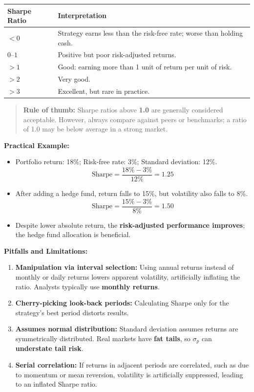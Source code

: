 \documentclass[12pt,openany]{book}
\begin{document}
\begin{center}
\begin{tabular}{|L{0.25\textwidth}|L{0.65\textwidth}|}
\hline
\textbf{Sharpe Ratio} & \textbf{Interpretation} \\
\hline
$< 0$ & Strategy earns less than the risk-free rate; worse than holding cash. \\
\hline
$0$--$1$ & Positive but poor risk-adjusted returns. \\
\hline
$> 1$ & Good: earning more than 1 unit of return per unit of risk. \\
\hline
$> 2$ & Very good. \\
\hline
$> 3$ & Excellent, but rare in practice. \\
\hline
\end{tabular}
\end{center}

\begin{quote}
    \textbf{Rule of thumb:} Sharpe ratios above \textbf{1.0} are generally considered acceptable. However, always compare against peers or benchmarks; a ratio of 1.0 may be below average in a strong market.
\end{quote}

\textbf{Practical Example:}
\begin{itemize}[leftmargin=*]
    \item Portfolio return: 18\%; Risk-free rate: 3\%; Standard deviation: 12\%.
    \begin{equation*}
        \text{Sharpe} = \frac{18\% - 3\%}{12\%} = 1.25
    \end{equation*}
    \item After adding a hedge fund, return falls to 15\%, but volatility also falls to 8\%.
    \begin{equation*}
        \text{Sharpe} = \frac{15\% - 3\%}{8\%} = 1.50
    \end{equation*}
    \item Despite lower absolute return, the \textbf{risk-adjusted performance improves}; the hedge fund allocation is beneficial.
\end{itemize}

\textbf{Pitfalls and Limitations:}
\begin{enumerate}[leftmargin=*]
    \item \textbf{Manipulation via interval selection:} Using annual returns instead of monthly or daily returns lowers apparent volatility, artificially inflating the ratio. Analysts typically use \textbf{monthly returns}.
    \item \textbf{Cherry-picking look-back periods:} Calculating Sharpe only for the strategy's best period distorts results.
    \item \textbf{Assumes normal distribution:} Standard deviation assumes returns are symmetrically distributed. Real markets have \textbf{fat tails}, so $\sigma_p$ can \textbf{understate tail risk}.
    \item \textbf{Serial correlation:} If returns in adjacent periods are correlated, such as due to momentum or mean reversion, volatility is artificially suppressed, leading to an inflated Sharpe ratio.
\end{enumerate}
\end{document}
